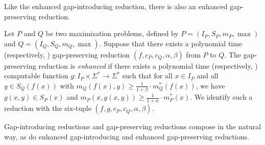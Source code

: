 \documentclass[]{article}
\begin{document}
Like the enhanced gap-introducing reduction, there is also an enhanced gap-preserving reduction.

\begin{definition}
  Let $P$ and $Q$ be two maximization problems, defined by $P = (I_P, S_P, m_P, \max)$ and $Q = (I_Q, S_Q, m_Q, \max)$.
  Suppose that there exists a polynomial time (respectively, \NC) gap-preserving reduction $(f, c_P, c_Q, \alpha, \beta)$ from $P$ to $Q$.
  The gap-preserving reduction is \emph{enhanced} if there exists a polynomial time (respectively, \NC) computable function $g \colon I_P \times \Sigma^* \to \Sigma^*$ such that for all $x \in I_P$ and all $y \in S_Q(f(x))$ with $m_Q(f(x), y) \geq \frac{1}{1 + \beta} \cdot m^*_Q(f(x))$, we have $g(x, y) \in S_P(x)$ and $m_P(x, g(x, y)) \geq \frac{1}{1 + \alpha} \cdot m^*_P(x)$.
  We identify such a reduction with the six-tuple $(f, g, c_P, c_Q, \alpha, \beta)$.
\end{definition}

Gap-introducing reductions and gap-preserving reductions compose in the natural way, as do enhanced gap-introducing and enhanced gap-preserving reductions.
\end{document}
